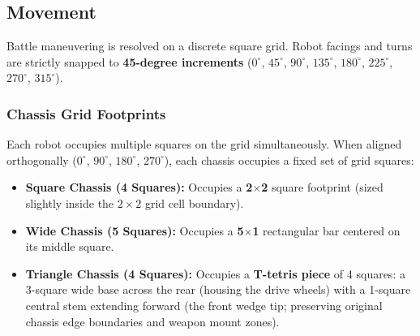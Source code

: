 \documentclass[11pt,a4paper]{article}
\begin{document}
\clearpage

\subsection{Movement}

Battle maneuvering is resolved on a discrete square grid. Robot facings and turns are strictly snapped to \textbf{45-degree increments} ($0^\circ$, $45^\circ$, $90^\circ$, $135^\circ$, $180^\circ$, $225^\circ$, $270^\circ$, $315^\circ$).

\subsubsection{Chassis Grid Footprints}
Each robot occupies multiple squares on the grid simultaneously. When aligned orthogonally ($0^\circ$, $90^\circ$, $180^\circ$, $270^\circ$), each chassis occupies a fixed set of grid squares:
\begin{itemize}[leftmargin=*, noitemsep, topsep=1pt]
  \item \textbf{Square Chassis (4 Squares):} Occupies a \textbf{2$\times$2} square footprint (sized slightly inside the $2\times2$ grid cell boundary).
  \item \textbf{Wide Chassis (5 Squares):} Occupies a \textbf{5$\times$1} rectangular bar centered on its middle square.
  \item \textbf{Triangle Chassis (4 Squares):} Occupies a \textbf{T-tetris piece} of 4 squares: a 3-square wide base across the rear (housing the drive wheels) with a 1-square central stem extending forward (the front wedge tip; preserving original chassis edge boundaries and weapon mount zones).
\end{itemize}
\end{document}
